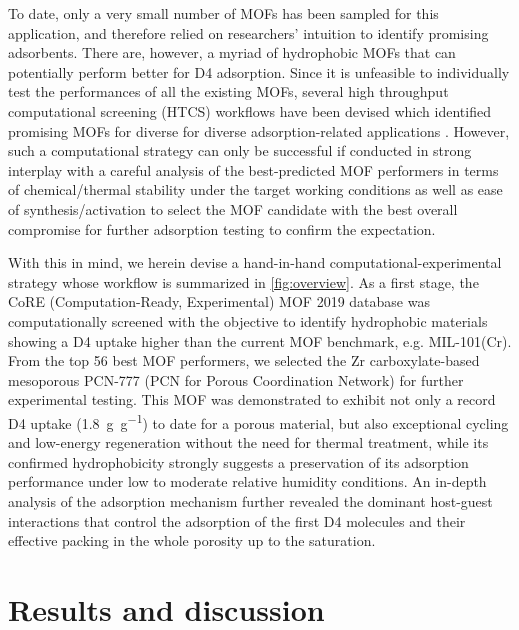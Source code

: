 To date, only a very small number of MOFs has been sampled for this application,
and therefore relied on researchers' intuition to identify promising adsorbents.
There are, however, a myriad of hydrophobic MOFs that can potentially perform
better for D4 adsorption. Since it is unfeasible to individually test the
performances of all the existing MOFs, several high throughput computational
screening (HTCS) workflows have been devised which identified promising MOFs for
diverse for diverse adsorption-related applications \citep{simonWhatAreBest2015,
parkEstablishingUpperBounds2017, moghadamComputeraidedDiscoveryMetal2018,
boydDatadrivenDesignMetal2019, shiMachineLearningSilico2020,
yaoInverseDesignNanoporous2021}. However, such a computational strategy can only
be successful if conducted in strong interplay with a careful analysis of the
best-predicted MOF performers in terms of chemical/thermal stability under the
target working conditions as well as ease of synthesis/activation to select the
MOF candidate with the best overall compromise for further adsorption testing to
confirm the expectation.

With this in mind, we herein devise a hand-in-hand computational-experimental
strategy whose workflow is summarized in \cref{fig:overview}. As a first stage,
the CoRE (Computation-Ready, Experimental) MOF 2019 database
\citep{chungAdvancesUpdatesAnalytics2019} was computationally screened with the
objective to identify hydrophobic materials showing a D4 uptake higher than the
current MOF benchmark, e.g. MIL-101(Cr). From the top 56 best MOF performers, we
selected the Zr carboxylate-based mesoporous PCN-777 (PCN for Porous
Coordination Network) for further experimental testing. This MOF was
demonstrated to exhibit not only a record D4 uptake (\SI{1.8}{\gram\per\gram})
to date for a porous material, but also exceptional cycling and low-energy
regeneration without the need for thermal treatment, while its confirmed
hydrophobicity strongly suggests a preservation of its adsorption performance
under low to moderate relative humidity conditions. An in-depth analysis of the
adsorption mechanism further revealed the dominant host-guest interactions that
control the adsorption of the first D4 molecules and their effective packing in
the whole porosity up to the saturation.

\section{Results and discussion}\label{results-and-discussion}


